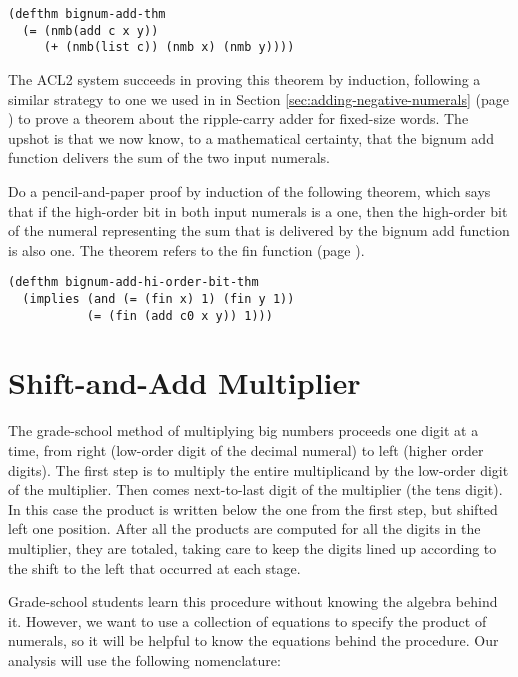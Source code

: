 \label{bignum-adder-thm}
\begin{Verbatim}
(defthm bignum-add-thm
  (= (nmb(add c x y))
     (+ (nmb(list c)) (nmb x) (nmb y))))
\end{Verbatim}

The ACL2 system succeeds in proving this theorem by induction,
following a similar strategy to one we used in in
Section \ref{sec:adding-negative-numerals}
(page \pageref{sec:adding-negative-numerals}) to prove a theorem
about the ripple-carry adder for fixed-size words.
The upshot is that we now know, to a mathematical certainty,
that the bignum add function delivers the sum of the two input numerals.

\begin{ExerciseList}
\Exercise Do a pencil-and-paper proof by induction of the following
theorem, which says that if the high-order bit in both input numerals is a one,
then the high-order bit of the numeral representing the sum that is delivered
by the bignum add function is also one.
The theorem refers to the fin function (page \pageref{fin-defun}).

\label{bignum-add-hi-order-bit-thm}
\begin{Verbatim}
(defthm bignum-add-hi-order-bit-thm
  (implies (and (= (fin x) 1) (fin y 1))
           (= (fin (add c0 x y)) 1)))
\end{Verbatim}
\end{ExerciseList}

\section{Shift-and-Add Multiplier}
\label{sec:bignum-mult}

The grade-school method of multiplying big numbers proceeds one digit at a time,
from right (low-order digit of the decimal numeral) to left (higher order digits).
The first step is to multiply the entire multiplicand by the low-order digit
of the multiplier.
Then comes next-to-last digit of the multiplier (the tens digit).
In this case the product is written below the one from the first step,
but shifted left one position. After all the products are computed for
all the digits in the multiplier, they are totaled, taking care to keep
the digits lined up according to the shift to the left that occurred at each stage.

Grade-school students learn this procedure without knowing
the algebra behind it. However, we want to use a collection of
equations to specify the product of numerals, so it will be helpful
to know the equations behind the procedure.
Our analysis will use the following nomenclature:


